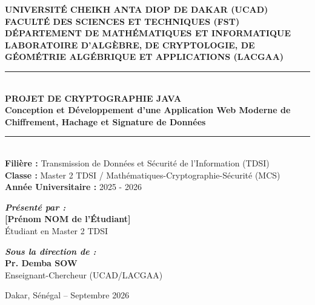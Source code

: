 \documentclass[12pt,a4paper]{report}
\begin{document}
\begin{titlepage}
    \begin{center}
        {\bfseries\large UNIVERSITÉ CHEIKH ANTA DIOP DE DAKAR (UCAD)}\\[0.2cm]
        {\bfseries\normalsize FACULTÉ DES SCIENCES ET TECHNIQUES (FST)}\\[0.2cm]
        {\bfseries\normalsize DÉPARTEMENT DE MATHÉMATIQUES ET INFORMATIQUE}\\[0.2cm]
        {\bfseries\normalsize LABORATOIRE D'ALGÈBRE, DE CRYPTOLOGIE, DE GÉOMÉTRIE ALGÉBRIQUE ET APPLICATIONS (LACGAA)}\\[0.8cm]

        \rule{\linewidth}{0.8mm}\\[0.4cm]
        {\LARGE\bfseries PROJET DE CRYPTOGRAPHIE JAVA}\\[0.2cm]
        {\Large\bfseries Conception et Développement d'une Application Web Moderne de Chiffrement, Hachage et Signature de Données}\\[0.2cm]
        \rule{\linewidth}{0.8mm}\\[0.8cm]

        {\large\bfseries Filière :} Transmission de Données et Sécurité de l'Information (TDSI)\\[0.2cm]
        {\large\bfseries Classe :} Master 2 TDSI / Mathématiques-Cryptographie-Sécurité (MCS)\\[0.2cm]
        {\large\bfseries Année Universitaire :} 2025 - 2026\\[1.2cm]

        \begin{minipage}{0.45\textwidth}
            \begin{flushleft} \large
                \emph{\textbf{Présenté par :}}\\[0.1cm]
                \textbf{[Prénom NOM de l'Étudiant]}\\
                Étudiant en Master 2 TDSI
            \end{flushleft}
        \end{minipage}
        \hfill
        \begin{minipage}{0.45\textwidth}
            \begin{flushright} \large
                \emph{\textbf{Sous la direction de :}}\\[0.1cm]
                \textbf{Pr. Demba SOW}\\
                Enseignant-Chercheur (UCAD/LACGAA)
            \end{flushright}
        \end{minipage}

        \vfill
        {\large Dakar, Sénégal -- Septembre 2026}
    \end{center}
\end{titlepage}
\end{document}
